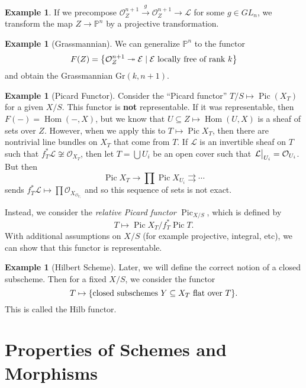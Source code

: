 \documentclass[leqno, openany]{memoir}
\theoremstyle{definition}
\newtheorem{exm}[thm]{Example}
\theoremstyle{remark}
\theoremstyle{plain}
\theoremstyle{definition}
\theoremstyle{remark}
\renewcommand{\P}{\mathbb{P}}
\newcommand{\mc}[1]{\mathcal{#1}}
\newcommand{\mr}[1]{\mathrm{#1}}
\DeclareMathOperator{\Hom}{Hom}
\DeclareMathOperator{\Pic}{Pic}
\begin{document}
\begin{exm} If we precompose $\mc{O}_{Z}^{n+1} \xrightarrow{g} \mc{O}_Z^{n+1}
\to \mc{L}$ for some $g \in GL_n$, we transform the map $Z \to \P^n$ by a
projective transformation.  \end{exm}

\begin{exm}[Grassmannian] We can generalize $\P^n$ to the functor \[ F(Z) =
\qty{\mc{O}_Z^{n+1} \twoheadrightarrow \mc{E} \mid \mc{E}\ \text{locally free
of rank $k$}} \] and obtain the Grassmannian $\mr{Gr}(k, n+1)$.  \end{exm}

\begin{exm}[Picard Functor] Consider the ``Picard functor'' $T/S \mapsto
    \Pic(X_T)$ for a given $X/S$. This functor is \textbf{not} representable.
    If it was representable, then $F(-) = \Hom(-,X)$, but we know that $U
    \subseteq Z \mapsto \Hom(U,X)$ is a sheaf of sets over $Z$. However, when
    we apply this to $T \mapsto \Pic X_T$, then there are nontrivial line
    bundles on $X_T$ that come from $T$. If $\mc{L}$ is an invertible sheaf on
    $T$ such that $f^*_T \mc{L} \not\cong \mc{O}_{X_T}$, then let $T = \bigcup
    U_i$ be an open cover such that $\eval{\mc{L}}_{U_i} = \mc{O}_{U_i}$. But
    then \[ \Pic X_T \to \prod \Pic X_{U_i} \rightrightarrows \cdots \] sends
    $f_T^* \mc{L} \mapsto \prod \mc{O}_{X_{\mc{O}_{U_i}}}$ and so this sequence
    of sets is not exact.

    Instead, we consider the \textit{relative Picard functor} $\Pic_{X/S}$,
    which is defined by \[ T \mapsto \Pic X_T / f_T^* \Pic T. \] With
    additional assumptions on $X/S$ (for example projective, integral, etc), we
    can show that this functor is representable.  \end{exm}

\begin{exm}[Hilbert Scheme] Later, we will define the correct notion of a
    closed subscheme. Then for a fixed $X/S$, we consider the functor \[ T
    \mapsto \qty{\text{closed subschemes}\ Y \subseteq X_T\ \text{flat over
$T$}}. \] This is called the $\mr{Hilb}$ functor.  \end{exm}

\section{Properties of Schemes and Morphisms}%
\label{sec:properties_of_schemes_and_morphisms}
\end{document}
